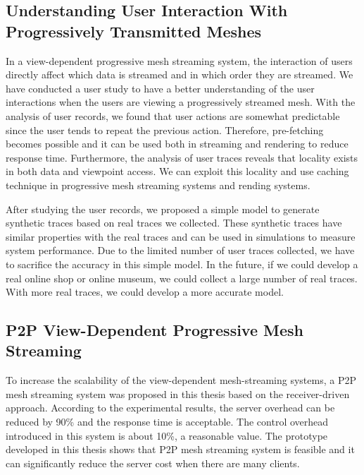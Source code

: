 \documentclass[11pt, a4paper]{report}
\begin{document}
\subsection{Understanding User Interaction With Progressively Transmitted Meshes} 
In a view-dependent progressive mesh streaming system, the interaction of users directly
affect which data is streamed and in which order they are streamed.
We have conducted a user study to have a better understanding of the user interactions when the users are 
viewing a progressively streamed mesh.
With the analysis of user records, we found that user actions are 
somewhat predictable since the user tends to repeat the previous 
action. 
Therefore, pre-fetching becomes possible and it can be used both in streaming and rendering to
reduce response time.
Furthermore, the analysis of user traces reveals that locality exists in both data and viewpoint access. 
We can exploit this locality and use caching technique in progressive mesh streaming systems and rending systems.

After studying the user records, we proposed a simple model 
to generate synthetic traces based on real traces we collected. 
These synthetic traces have similar properties with the real traces and 
can be used in simulations to measure system performance.
Due to the limited number of user traces collected, we have to 
sacrifice the accuracy in this simple model. In the future, if we could develop a real 
online shop or online museum, we could collect a large number of real traces.
With more real traces, we could develop a more accurate model.

\subsection{P2P View-Dependent Progressive Mesh Streaming}
To increase the scalability of the view-dependent mesh-streaming systems, 
a P2P mesh streaming system was proposed in this thesis based on the receiver-driven approach. 
According to the experimental results, the server overhead can be reduced by 90\%
and the response time is acceptable. %
The control overhead introduced in this system is about 10\%, a reasonable value. 
The prototype developed in this thesis shows that P2P mesh streaming system is feasible
and it can significantly reduce the server cost when there are many clients.
\end{document}
